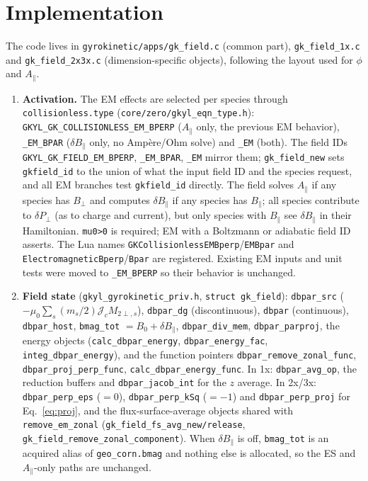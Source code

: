 \documentclass[11pt, letterpaper]{article}
\newcommand{\dBpar}{\delta B_\parallel}
\newcommand{\Apar}{A_\parallel}
\newcommand{\code}[1]{\texttt{#1}}
\begin{document}
\section{Implementation}
\label{sec:impl}
The code lives in \code{gyrokinetic/apps/gk\_field.c} (common part),
\code{gk\_field\_1x.c} and \code{gk\_field\_2x3x.c} (dimension-specific objects), following the
layout used for $\phi$ and $\Apar$.
\begin{enumerate}
  \item \textbf{Activation.} The EM effects are selected per species through
  \code{collisionless.type} (\code{core/zero/gkyl\_eqn\_type.h}):
  \code{GKYL\_GK\_COLLISIONLESS\_EM\_BPERP} ($\Apar$ only, the previous EM behavior),
  \code{\_EM\_BPAR} ($\dBpar$ only, no Amp\`ere/Ohm solve) and \code{\_EM} (both). The field IDs
  \code{GKYL\_GK\_FIELD\_EM\_BPERP}, \code{\_EM\_BPAR}, \code{\_EM} mirror them; \code{gk\_field\_new}
  sets \code{gkfield\_id} to the union of what the input field ID and the species request, and all
  EM branches test \code{gkfield\_id} directly. The field solves $\Apar$ if any species has
  $B_\perp$ and computes $\dBpar$ if any species has $B_\parallel$; all species contribute to
  $\delta P_\perp$ (as to charge and current), but only species with $B_\parallel$ see $\dBpar$ in
  their Hamiltonian. \code{mu0>0} is required; EM with a Boltzmann or adiabatic field ID asserts.
  The Lua names \code{GKCollisionlessEMBperp}/\code{EMBpar} and
  \code{ElectromagneticBperp}/\code{Bpar} are registered. Existing EM inputs and unit tests were
  moved to \code{\_EM\_BPERP} so their behavior is unchanged.

  \item \textbf{Field state} (\code{gkyl\_gyrokinetic\_priv.h}, \code{struct gk\_field}):
  \code{dbpar\_src} ($-\mu_0\sum_s (m_s/2)\mathcal{J}_cM_{2\perp,s}$), \code{dbpar\_dg}
  (discontinuous), \code{dbpar} (continuous), \code{dbpar\_host}, \code{bmag\_tot}
  $=B_0+\dBpar$, \code{dbpar\_div\_mem}, \code{dbpar\_parproj}, the energy objects
  (\code{calc\_dbpar\_energy}, \code{dbpar\_energy\_fac}, \code{integ\_dbpar\_energy}), and the
  function pointers \code{dbpar\_remove\_zonal\_func}, \code{dbpar\_proj\_perp\_func},
  \code{calc\_dbpar\_energy\_func}. In 1x: \code{dbpar\_avg\_op}, the reduction buffers and
  \code{dbpar\_jacob\_int} for the $z$ average. In 2x/3x: \code{dbpar\_perp\_eps} ($=0$),
  \code{dbpar\_perp\_kSq} ($=-1$) and \code{dbpar\_perp\_proj} for Eq.~\eqref{eq:proj}, and the
  flux-surface-average objects shared with \code{remove\_em\_zonal}
  (\code{gk\_field\_fs\_avg\_new/release}, \code{gk\_field\_remove\_zonal\_component}). When
  $\dBpar$ is off, \code{bmag\_tot} is an acquired alias of \code{geo\_corn.bmag} and nothing else
  is allocated, so the ES and $\Apar$-only paths are unchanged.


\end{enumerate}
\end{document}
